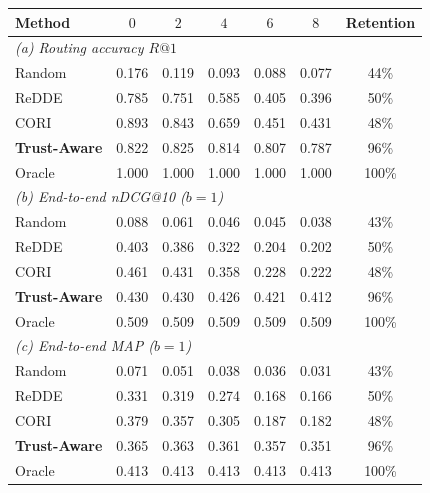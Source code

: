 \begin{tabular}{l ccccc c}
\toprule
Method & $0$ & $2$ & $4$ & $6$ & $8$ & Retention \\
\midrule
\multicolumn{7}{l}{\emph{(a) Routing accuracy $R@1$}}\\
\midrule
Random & 0.176 & 0.119 & 0.093 & 0.088 & 0.077 & 44\% \\
ReDDE & 0.785 & 0.751 & 0.585 & 0.405 & 0.396 & 50\% \\
CORI & 0.893 & 0.843 & 0.659 & 0.451 & 0.431 & 48\% \\
\textbf{Trust-Aware} & 0.822 & 0.825 & 0.814 & 0.807 & 0.787 & 96\% \\
Oracle & 1.000 & 1.000 & 1.000 & 1.000 & 1.000 & 100\% \\
\midrule
\multicolumn{7}{l}{\emph{(b) End-to-end nDCG@10 ($b{=}1$)}}\\
\midrule
Random & 0.088 & 0.061 & 0.046 & 0.045 & 0.038 & 43\% \\
ReDDE & 0.403 & 0.386 & 0.322 & 0.204 & 0.202 & 50\% \\
CORI & 0.461 & 0.431 & 0.358 & 0.228 & 0.222 & 48\% \\
\textbf{Trust-Aware} & 0.430 & 0.430 & 0.426 & 0.421 & 0.412 & 96\% \\
Oracle & 0.509 & 0.509 & 0.509 & 0.509 & 0.509 & 100\% \\
\midrule
\multicolumn{7}{l}{\emph{(c) End-to-end MAP ($b{=}1$)}}\\
\midrule
Random & 0.071 & 0.051 & 0.038 & 0.036 & 0.031 & 43\% \\
ReDDE & 0.331 & 0.319 & 0.274 & 0.168 & 0.166 & 50\% \\
CORI & 0.379 & 0.357 & 0.305 & 0.187 & 0.182 & 48\% \\
\textbf{Trust-Aware} & 0.365 & 0.363 & 0.361 & 0.357 & 0.351 & 96\% \\
Oracle & 0.413 & 0.413 & 0.413 & 0.413 & 0.413 & 100\% \\
\bottomrule
\end{tabular}
